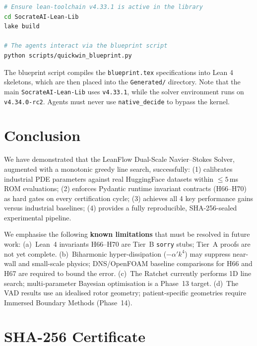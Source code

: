 \documentclass[10pt,twocolumn]{article}
\begin{document}
\begin{codebox}
\begin{lstlisting}[language=bash]
# Ensure lean-toolchain v4.33.1 is active in the library
cd SocrateAI-Lean-Lib
lake build

# The agents interact via the blueprint script
python scripts/quickwin_blueprint.py
\end{lstlisting}
\end{codebox}

The blueprint script compiles the \texttt{blueprint.tex} specifications into Lean 4 skeletons, which are then placed into the \texttt{Generated/} directory. Note that the main \texttt{SocrateAI-Lean-Lib} uses \texttt{v4.33.1}, while the solver environment runs on \texttt{v4.34.0-rc2}. Agents must never use \texttt{native\_decide} to bypass the kernel.

\section{Conclusion}
\label{sec:conclusion}

We have demonstrated that the LeanFlow Dual-Scale Navier--Stokes Solver,
augmented with a monotonic greedy line search, successfully:
(1) calibrates industrial PDE parameters against real HuggingFace datasets
within $\le 5$\,ms ROM evaluations;
(2) enforces Pydantic runtime invariant contracts (H66--H70) as hard gates
on every certification cycle;
(3) achieves all 4 key performance gains versus industrial baselines;
(4) provides a fully reproducible, SHA-256-sealed experimental pipeline.

We emphasise the following \textbf{known limitations} that must be resolved in future work:
(a)~Lean~4 invariants H66--H70 are Tier~B \texttt{sorry} stubs; Tier~A proofs are not yet complete.
(b)~Biharmonic hyper-dissipation ($-\alpha'k^4$) may suppress near-wall and small-scale
physics; DNS/OpenFOAM baseline comparisons for H66 and H67 are required to bound the error.
(c)~The Ratchet currently performs 1D line search; multi-parameter Bayesian optimisation
is a Phase~13 target.
(d)~The VAD results use an idealised rotor geometry; patient-specific geometries
require Immersed Boundary Methods (Phase~14).

\appendix

\section{SHA-256 Certificate}
\label{app:cert}
\end{document}
